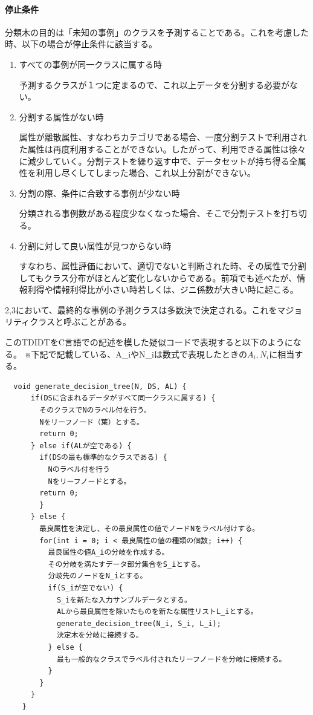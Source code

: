 \documentclass[dvipdfmx]{jsarticle}
\begin{document}
\paragraph{停止条件}
分類木の目的は「未知の事例」のクラスを予測することである。これを考慮した時、以下の場合が停止条件に該当する。
\begin{enumerate}
  \item すべての事例が同一クラスに属する時 \par
  予測するクラスが１つに定まるので、これ以上データを分割する必要がない。
  \item 分割する属性がない時 \par
  属性が離散属性、すなわちカテゴリである場合、一度分割テストで利用された属性は再度利用することができない。したがって、利用できる属性は徐々に減少していく。分割テストを繰り返す中で、データセットが持ち得る全属性を利用し尽くしてしまった場合、これ以上分割ができない。
  \item 分割の際、条件に合致する事例が少ない時 \par
  分類される事例数がある程度少なくなった場合、そこで分割テストを打ち切る。
  \item 分割に対して良い属性が見つからない時 \par
  すなわち、属性評価において、適切でないと判断された時、その属性で分割してもクラス分布がほとんど変化しないからである。前項でも述べたが、情報利得や情報利得比が小さい時若しくは、ジニ係数が大きい時に起こる。
\end{enumerate}
2,3において、最終的な事例の予測クラスは多数決で決定される。これをマジョリティクラスと呼ぶことがある。\par
このTDIDTをC言語での記述を模した疑似コードで表現すると以下のようになる。
※下記で記載している、A\_iやN\_iは数式で表現したときの$A_{i}, N_{i}$に相当する。
\begin{verbatim}
  void generate_decision_tree(N, DS, AL) {
      if(DSに含まれるデータがすべて同一クラスに属する) {
        そのクラスでNのラベル付を行う。
        Nをリーフノード（葉）とする。
        return 0;
      } else if(ALが空である) {
        if(DSの最も標準的なクラスである) {
          Nのラベル付を行う
          Nをリーフノードとする。
        return 0;
        }
      } else {
        最良属性を決定し、その最良属性の値でノードNをラベル付けする。
        for(int i = 0; i < 最良属性の値の種類の個数; i++) {
          最良属性の値A_iの分岐を作成する。
          その分岐を満たすデータ部分集合をS_iとする。
          分岐先のノードをN_iとする。
          if(S_iが空でない) {
            S_iを新たな入力サンプルデータとする。
            ALから最良属性を除いたものを新たな属性リストL_iとする。
            generate_decision_tree(N_i, S_i, L_i);
            決定木を分岐に接続する。
          } else {
            最も一般的なクラスでラベル付されたリーフノードを分岐に接続する。
          }
        }
      }
    }
\end{verbatim}
\end{document}
